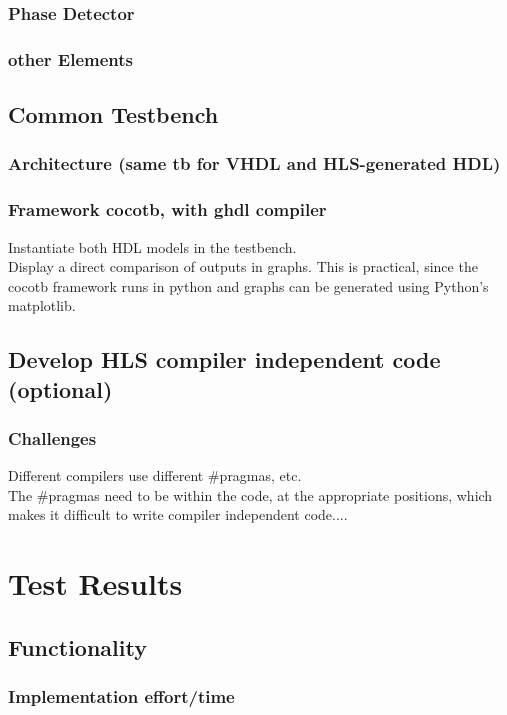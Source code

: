     \subsection{Phase Detector}
    \subsection{other Elements}

  \section{Common Testbench}
    \subsection{Architecture (same tb for VHDL and HLS-generated HDL)}
    \subsection{Framework cocotb, with ghdl compiler}
        Instantiate both HDL models in the testbench.\\
        Display a direct comparison of outputs in graphs. This is practical, since the cocotb framework runs in python and graphs can be generated using Python's matplotlib.

  \section{Develop HLS compiler independent code (optional)}
    \subsection{Challenges}
     Different compilers use different \#pragmas, etc.\\
     The \#pragmas need to be within the code, at the appropriate positions, which makes it difficult to write compiler independent code....


\chapter{Test Results}
  \section{Functionality}
  \subsection{Implementation effort/time}
